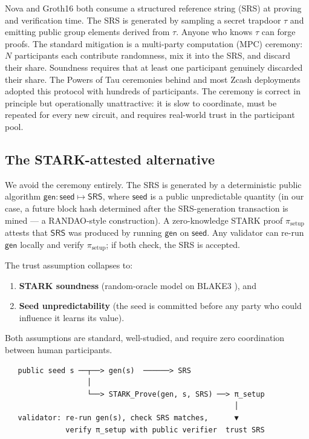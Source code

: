 \documentclass[11pt,a4paper]{article}
\begin{document}
Nova and Groth16 both consume a structured reference string (SRS) at proving
and verification time. The SRS is generated by sampling a secret trapdoor $\tau$
and emitting public group elements derived from $\tau$. Anyone who knows $\tau$
can forge proofs. The standard mitigation is a multi-party computation (MPC)
ceremony: $N$ participants each contribute randomness, mix it into the SRS,
and discard their share. Soundness requires that at least one participant
genuinely discarded their share. The Powers of Tau ceremonies behind
\cite{Groth16} and most Zcash deployments adopted this protocol with hundreds
of participants. The ceremony is correct in principle but operationally
unattractive: it is slow to coordinate, must be repeated for every new
circuit, and requires real-world trust in the participant pool.

\subsection{The STARK-attested alternative}

We avoid the ceremony entirely. The SRS is generated by a deterministic
public algorithm $\mathsf{gen}: \mathsf{seed} \mapsto \mathsf{SRS}$, where
$\mathsf{seed}$ is a public unpredictable quantity (in our case, a future
block hash determined after the SRS-generation transaction is mined --- a
RANDAO-style construction). A zero-knowledge STARK proof
$\pi_{\mathrm{setup}}$ attests that $\mathsf{SRS}$ was produced by running
$\mathsf{gen}$ on $\mathsf{seed}$. Any validator can re-run $\mathsf{gen}$
locally and verify $\pi_{\mathrm{setup}}$; if both check, the SRS is accepted.

The trust assumption collapses to:
\begin{enumerate}[leftmargin=2em,topsep=0pt]
\item \textbf{STARK soundness} (random-oracle model on BLAKE3
      \cite{BLAKE3spec,BSBHR2018STARK}), and
\item \textbf{Seed unpredictability} (the seed is committed before any party
      who could influence it learns its value).
\end{enumerate}
Both assumptions are standard, well-studied, and require zero coordination
between human participants.

\vspace{0.5em}
\begin{verbatim}
   public seed s ──┬──> gen(s)  ──────> SRS
                   │
                   └──> STARK_Prove(gen, s, SRS) ──> π_setup
                                                     │
   validator: re-run gen(s), check SRS matches,      ▼
              verify π_setup with public verifier  trust SRS
\end{verbatim}
\vspace{0.5em}
\end{document}
